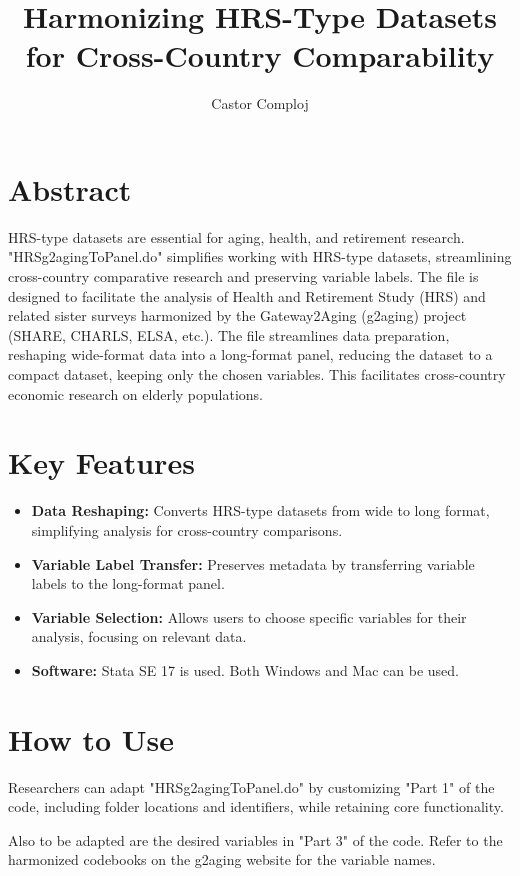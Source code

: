 \documentclass{article}
\title{Harmonizing HRS-Type Datasets for Cross-Country Comparability}
\author{Castor Comploj}
\date{}
\begin{document}
\maketitle

\section{Abstract}
HRS-type datasets are essential for aging, health, and retirement research.
"HRSg2agingToPanel.do" simplifies working with HRS-type datasets, streamlining cross-country comparative research and preserving variable labels. The file is designed to facilitate the analysis of Health and Retirement Study (HRS) and related sister surveys harmonized by the Gateway2Aging (g2aging) project (SHARE, CHARLS, ELSA, etc.). The file streamlines data preparation, reshaping wide-format data into a long-format panel, reducing the dataset to a compact dataset, keeping only the chosen variables. This facilitates cross-country economic research on elderly populations. 

\section{Key Features}
\begin{itemize}
    \item \textbf{Data Reshaping:} Converts HRS-type datasets from wide to long format, simplifying analysis for cross-country comparisons.
    \item \textbf{Variable Label Transfer:} Preserves metadata by transferring variable labels to the long-format panel.
    \item \textbf{Variable Selection:} Allows users to choose specific variables for their analysis, focusing on relevant data.
    \item \textbf{Software:} Stata SE 17 is used. Both Windows and Mac can be used. 
\end{itemize}

\section{How to Use}
Researchers can adapt "HRSg2agingToPanel.do" by customizing "Part 1" of the code, including folder locations and identifiers, while retaining core functionality.

Also to be adapted are the desired variables in "Part 3" of the code. Refer to the harmonized codebooks on the g2aging website for the variable names.
\end{document}
